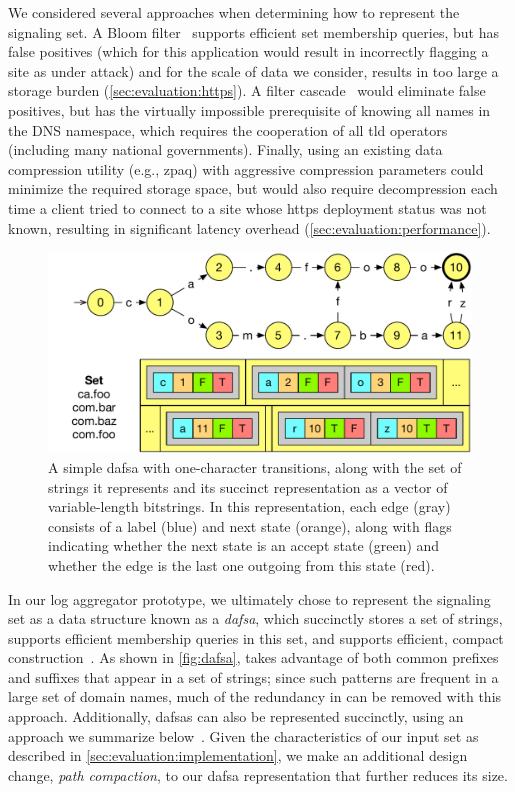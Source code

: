 We considered several approaches when determining how to represent the signaling
set. A Bloom filter~\cite{bloom1970space} supports efficient set membership
queries, but has false positives (which for this application would result in
incorrectly flagging a site as under attack) and for the scale of data we
consider, results in too large a storage burden
(\autoref{sec:evaluation:https}). A filter cascade~\cite{salikhov2014using}
would eliminate false positives, but has the virtually impossible prerequisite
of knowing all names in the DNS namespace, which requires the cooperation of all
\ac{tld} operators (including many national governments). Finally, using an
existing data compression utility (e.g., zpaq) with aggressive compression
parameters could minimize the required storage space, but would also require
decompression each time a client tried to connect to a site whose \ac{https}
deployment status was not known, resulting in significant latency overhead
(\autoref{sec:evaluation:performance}).

\begin{figure}
  \centering
  \includegraphics[width=\linewidth]{fig/dafsa}
  \caption{A simple \ac{dafsa} with one-character transitions, along with the
    set of strings it represents and its succinct representation as a vector of
    variable-length bitstrings. In this representation, each edge (gray)
    consists of a label (blue) and next state (orange), along with flags
  indicating whether the next state is an accept state (green) and whether the
edge is the last one outgoing from this state (red).}
  \label{fig:dafsa}
\end{figure}

In our log aggregator prototype, we ultimately chose to represent the signaling
set as a data structure known as a \emph{\acf{dafsa}}, which succinctly stores a
set of strings, supports efficient membership queries in this set, and supports 
efficient, compact construction~\cite{daciuk2000incremental}. As shown
in \autoref{fig:dafsa},  takes advantage of both common prefixes and
suffixes that appear in a set of strings; since such patterns are frequent in a
large set of domain names, much of the redundancy in \httpsset can be removed with this
approach. Additionally, \acp{dafsa} can also be represented succinctly, using an
approach we summarize below~\cite{daciuk2012smaller}. Given the characteristics
of our input set as described in \autoref{sec:evaluation:implementation}, we
make an additional design change, \emph{path compaction},
to our \ac{dafsa} representation that further reduces its size.

